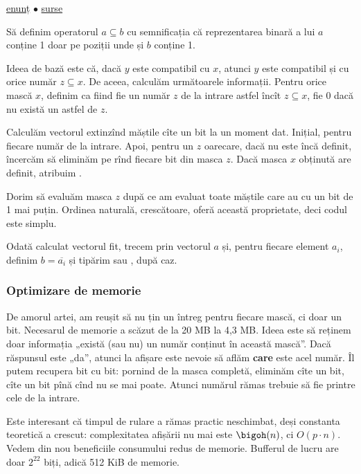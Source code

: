 \href{https://codeforces.com/contest/165/problem/E}{enunț}
$\bullet$
\hyperref[code:compatible-numbers]{surse}

Să definim operatorul $a \subseteq b$ cu semnificația că reprezentarea binară a lui $a$ conține 1 doar pe poziții unde și $b$ conține 1.

Ideea de bază este că, dacă $y$ este compatibil cu $x$, atunci $y$ este compatibil și cu orice număr $z \subseteq x$. De aceea, calculăm următoarele informații. Pentru orice mască $x$, definim  ca fiind fie un număr $z$ de la intrare astfel încît \(z \subseteq x\), fie 0 dacă nu există un astfel de $z$.

Calculăm vectorul  extinzînd măștile cîte un bit la un moment dat. Inițial,  pentru fiecare număr de la intrare. Apoi, pentru un $z$ oarecare, dacă  nu este încă definit, încercăm să eliminăm pe rînd fiecare bit din masca $z$. Dacă masca $x$ obținută are  definit, atribuim .

Dorim să evaluăm masca $z$ după ce am evaluat toate măștile care au cu un bit de 1 mai puțin. Ordinea naturală, crescătoare, oferă această proprietate, deci codul este simplu.

Odată calculat vectorul fit, trecem prin vectorul $a$ și, pentru fiecare element $a_i$, definim $b = \overline{a_i}$ și tipărim  sau , după caz.

\subsubsection*{Optimizare de memorie}

De amorul artei, am reușit să nu țin un întreg pentru fiecare mască, ci doar un bit. Necesarul de memorie a scăzut de la 20 MB la 4,3 MB. Ideea este să reținem doar informația „există (sau nu) un număr conținut în această mască”. Dacă răspunsul este „da”, atunci la afișare este nevoie să aflăm \textbf{care} este acel număr. Îl putem recupera bit cu bit: pornind de la masca completă, eliminăm cîte un bit, cîte un bit pînă cînd nu se mai poate. Atunci numărul rămas trebuie să fie printre cele de la intrare.

Este interesant că timpul de rulare a rămas practic neschimbat, deși constanta teoretică a crescut: complexitatea afișării nu mai este $\bigoh(n)$, ci $O(p \cdot n)$. Vedem din nou beneficiile consumului redus de memorie. Bufferul de lucru are doar $2^{22}$ biți, adică 512 KiB de memorie.

